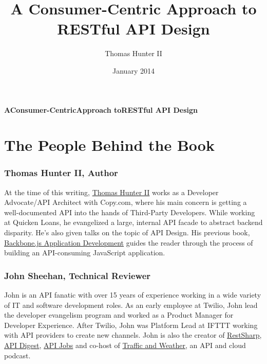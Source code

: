 \documentclass{book}
\title{A Consumer-Centric Approach to RESTful API Design}
\author{Thomas Hunter II}
\date{January 2014}
\begin{document}
\thispagestyle{empty}
\null
\vfill

\paragraph{\Large{A\newline{}Consumer-Centric\newline{}Approach to\newline{}RESTful API Design\newline{}}}

\newpage


\section*{The People Behind the Book}

\subsubsection*{Thomas Hunter II, Author}

At the time of this writing, \href{http://thomashunter.name}{Thomas Hunter II} works as a Developer Advocate/API Architect with Copy.com, where his main concern is getting a well-documented API into the hands of Third-Party Developers. While working at Quicken Loans, he evangelized a large, internal API facade to abstract backend disparity. He's also given talks on the topic of API Design. His previous book, \href{http://amzn.to/1aqVRvq}{Backbone.js Application Development} guides the reader through the process of building an API-consuming JavaScript application.

\subsubsection*{John Sheehan, Technical Reviewer}

John is an API fanatic with over 15 years of experience working in a wide variety of IT and software development roles. As an early employee at Twilio, John lead the developer evangelism program and worked as a Product Manager for Developer Experience. After Twilio, John was Platform Lead at IFTTT working with API providers to create new channels. John is also the creator of \href{https://www.github.com/restsharp/restsharp}{RestSharp}, \href{http://www.apidigest.com/}{API Digest}, \href{http://www.api-jobs.com/}{API Jobs} and co-host of \href{http://trafficandweather.io/}{Traffic and Weather}, an API and cloud podcast.
\end{document}
